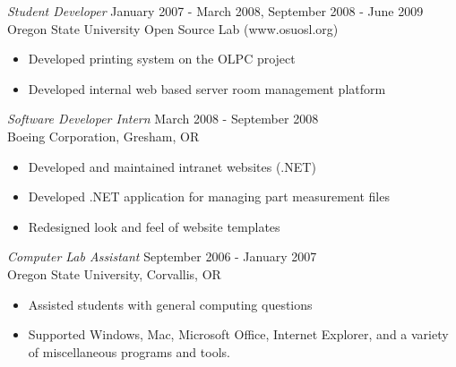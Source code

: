\documentclass[margin]{res}
\begin{document}
\begin{resume}
                {\sl Student Developer} \hfill            January 2007 - March 2008, September 2008 - June 2009 \\
                Oregon State University Open Source Lab (www.osuosl.org)
                 \begin{itemize}  \itemsep -2pt %
                 \item Developed printing system on the OLPC project
				 \item Developed internal web based server room management platform
                 \end{itemize}

                {\sl Software Developer Intern} \hfill         March 2008 - September 2008\\
                Boeing Corporation, Gresham, OR
                  \begin{itemize}
                   \item Developed and maintained intranet websites (.NET)
				   \item Developed .NET application for managing part measurement files
				   \item Redesigned look and feel of website templates
                   \end{itemize} 
 
 				{\sl Computer Lab Assistant} \hfill         September 2006 - January 2007\\
                Oregon State University, Corvallis, OR
                  \begin{itemize}
                   \item Assisted students with general computing questions
				   \item Supported Windows, Mac, Microsoft Office, Internet Explorer, and a variety
				   of miscellaneous programs and tools.
                   \end{itemize} 
\end{resume}
\end{document}
